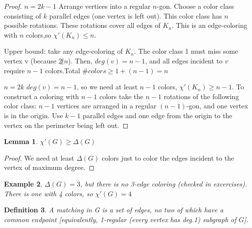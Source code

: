 \documentclass[a4paper]{article}
\theoremstyle{plain}
\newtheorem{lemma}{Lemma}
\newtheorem{definition}[lemma]{Definition}
\theoremstyle{myremark}
\newtheorem{example}[lemma]{Example}
\begin{document}
\begin {proof}
\underline {$n=2k-1$}
Arrange vertices into a regular $n$-gon. Choose a color class consisting of $k$ parallel edges (one vertex is left out). This color class has $n$ possible rotations. These rotations cover all edges of $K_n$. This is an edge-coloring with $n$ colors,so $\chi'(K_n) \leq n$.

Upper bound: take any edge-coloring of $K_n$. The color class 1 must miss some vertex v (because $2\not|n$). Then, $deg(v)=n-1$, and all edges incident to $v$ require $n-1$ colors.Total $\# colors \geq 1+(n-1)=n$
\newline


\underline {$n=2k$}
$deg(v)=n-1$, so we need at least $n-1$ colors, $\chi'(K_n) \geq n-1$. To construct a coloring with $n-1$ colors take the $n-1$ rotations of the following color class: $n-1$ vertices are arranged in a regular $(n-1)$-gon, and one vertex is in the origin. Use $k-1$ parallel edges and one edge from the origin to the vertex on the perimeter being left out.
\end {proof}
\begin {lemma} 
$\chi'(G) \geq \Delta(G)$
\end {lemma}
\begin {proof}
We need at least $\Delta(G)$ colors just to color the edges incident to the vertex of maximum degree.
\end {proof}
\begin {example}
$\Delta(G)=3$, but there is no 3-edge coloring (checked in excercises). There is one with 4 colors, so $\chi'(G)=4$
\end {example}
\begin {center}
\end {center}
\begin {definition}
A \emph {matching} in G is a set of edges, no two of which have a common endpoint [equivalently, 1-regular (every vertex has deg.1) subgraph of $G$].
\end {definition} 
\end{document}
